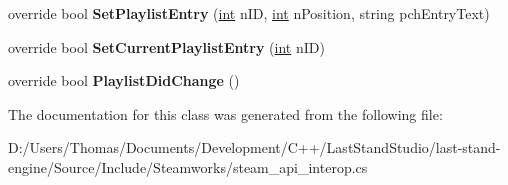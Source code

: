\begin{DoxyCompactItemize}
\item 
\hypertarget{classValve_1_1Steamworks_1_1CSteamMusicRemote_a5cf2168613514a41ba5e1eccf28f6bef}{}override bool {\bfseries Set\+Playlist\+Entry} (\hyperlink{SDL__thread_8h_a6a64f9be4433e4de6e2f2f548cf3c08e}{int} n\+I\+D, \hyperlink{SDL__thread_8h_a6a64f9be4433e4de6e2f2f548cf3c08e}{int} n\+Position, string pch\+Entry\+Text)\label{classValve_1_1Steamworks_1_1CSteamMusicRemote_a5cf2168613514a41ba5e1eccf28f6bef}

\item 
\hypertarget{classValve_1_1Steamworks_1_1CSteamMusicRemote_aaf7b4b050408b226dd672dade3e99f83}{}override bool {\bfseries Set\+Current\+Playlist\+Entry} (\hyperlink{SDL__thread_8h_a6a64f9be4433e4de6e2f2f548cf3c08e}{int} n\+I\+D)\label{classValve_1_1Steamworks_1_1CSteamMusicRemote_aaf7b4b050408b226dd672dade3e99f83}

\item 
\hypertarget{classValve_1_1Steamworks_1_1CSteamMusicRemote_a2cd7c8a0abc11a6b9fc0ace49fb9cf90}{}override bool {\bfseries Playlist\+Did\+Change} ()\label{classValve_1_1Steamworks_1_1CSteamMusicRemote_a2cd7c8a0abc11a6b9fc0ace49fb9cf90}

\end{DoxyCompactItemize}


The documentation for this class was generated from the following file\+:\begin{DoxyCompactItemize}
\item 
D\+:/\+Users/\+Thomas/\+Documents/\+Development/\+C++/\+Last\+Stand\+Studio/last-\/stand-\/engine/\+Source/\+Include/\+Steamworks/steam\+\_\+api\+\_\+interop.\+cs\end{DoxyCompactItemize}
